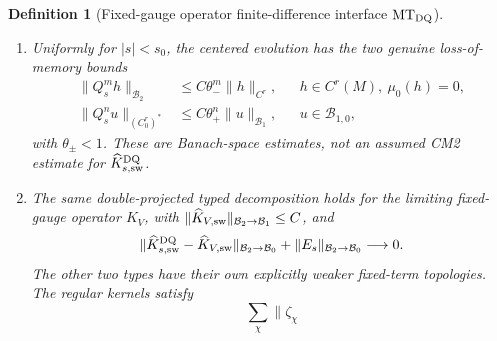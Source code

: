 \documentclass[11pt]{article}
\newtheorem{definition}[theorem]{Definition}
\newcommand{\cB}{\mathcal B}
\begin{document}
\begin{definition}[Fixed-gauge operator finite-difference interface
$\mathrm{MT}_{\rm DQ}$]
\begin{enumerate}[label=\textup{(MT\arabic*)}]
      while the graph-supported part belongs to the existing physical face
      atlas and obeys the uniform strong face ledger
      \begin{equation}
      \label{eq:uniform-gauge-DQ-face}
       \sup_{0<|s|<s_0}\sum_{\lambda}M_{s,\lambda}
       \|w_{s,\lambda}\|_{\mathcal A^\alpha}
       \mathfrak d_{s,\lambda}^{A_{\rm dom}}
       \operatorname{Mark}(s,\lambda)^2
       \{1+Z(\mathcal G_{s,\lambda}^-)
              +Z(\mathcal G_{s,\lambda}^+)\}<\infty .
      \end{equation}
      This is the face summand of
      \eqref{eq:event-physical-norm}, not a convergence assertion.  Finally,
      \begin{equation}
      \label{eq:uniform-strong-weak-DQ}
       \sup_{0<|s|<s_0}
       \left(\|\widehat K_{s,\rm sw}^{\rm DQ}\|_{\cB_2\to\cB_1}
       +\|E_s\|_{\cB_2\to\cB_1}\right)<\infty.
      \end{equation}
      A graph-supported boundary contribution of the commutator is included
      in $\widehat K_{s,\rm face}^{\rm DQ}$; it is never called an $M\times M$
      density.
\item Uniformly for $|s|<s_0$, the centered evolution has the two genuine
      loss-of-memory bounds
      \begin{align}
       \|Q_s^mh\|_{\cB_2}
       &\le C\theta_-^m\|h\|_{C^r},
       &&h\in C^r(M),\ \mu_0(h)=0,
       \label{eq:strong-side-memory}\\
       \|Q_s^nu\|_{(C^r_0)^*}
       &\le C\theta_+^n\|u\|_{\cB_1},
       &&u\in\cB_{1,0},
       \label{eq:response-side-memory}
      \end{align}
      with $\theta_\pm<1$.  These are Banach-space estimates, not an
      assumed CM2 estimate for $\widehat K_{s,\rm sw}^{\rm DQ}$.
\item The same double-projected typed decomposition holds for the limiting
      fixed-gauge operator $K_V$, with
      $\|\widehat K_{V,\rm sw}\|_{\cB_2\to\cB_1}\le C$, and
      \begin{equation}
      \label{eq:strong-DQ-convergence}
       \|\widehat K_{s,\rm sw}^{\rm DQ}-\widehat K_{V,\rm sw}\|_{\cB_2\to\cB_0}
       +\|E_s\|_{\cB_2\to\cB_0}\longrightarrow0.
      \end{equation}
      The other two types have their own explicitly weaker fixed-term
      topologies.  The regular kernels satisfy
      \begin{equation}
      \label{eq:regular-DQ-weak-convergence}
       \sum_\chi\|\zeta_\chi

\end{equation}
\end{enumerate}
\end{definition}
\end{document}
